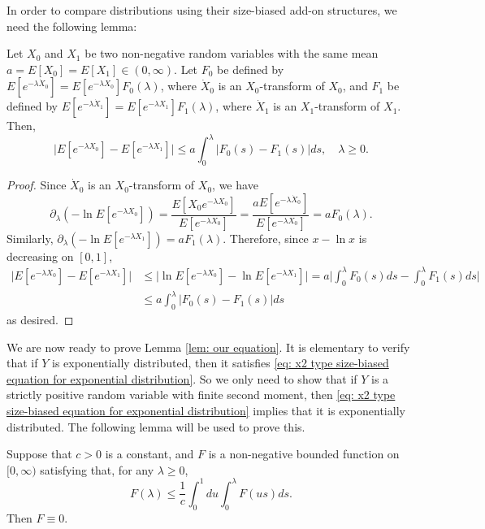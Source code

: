 \documentclass[ECP]{ejpecp} %
\begin{document}
In order to compare distributions using their size-biased add-on structures, we need the following lemma:
\begin{lemma}\label{lem: compare}
	Let $X_0$ and $X_1$ be two non-negative random variables with the same mean $a = E[X_0] = E[X_1] \in (0,\infty)$.
	Let $F_0$ be defined by $E[e^{-\lambda \dot X_0}] = E[e^{-\lambda X_0}] F_0(\lambda)$,
	where $\dot X_0$ is an $X_0$-transform of $X_0$,
	and $F_1$ be defined by $E[e^{-\lambda \dot X_1}] = E[e^{-\lambda X_1}] F_1(\lambda)$,
	where $\dot X_1$ is an $X_1$-transform of $X_1$.
	Then,
	\[
	\big| E[e^{-\lambda X_0}] - E[e^{-\lambda X_1}] \big|
	\leq a \int_0^\lambda| F_0(s) - F_1(s) |ds, \quad \lambda \geq 0.
	\]
\end{lemma}
\begin{proof}
	Since $\dot X_0$ is an $X_0$-transform of $X_0$,
	we have
	\[
	\partial_\lambda ( -\ln E[e^{-\lambda X_0}]) = \frac { E[X_0 e^{-\lambda X_0}]}{ E[e^{-\lambda X_0}] }
	= \frac{a E[e^{-\lambda \dot X_0}]}{E[e^{-\lambda X_0}]}
	= a F_0(\lambda).
	\]
	Similarly, $\partial_\lambda ( -\ln E[e^{-\lambda X_1}]) = a F_1(\lambda)$.
	Therefore,
	since $x - \ln x$ is decreasing on $[0,1]$,
	\[\begin{split}
	\big| E[e^{-\lambda X_0}] - E[e^{-\lambda X_1}] \big|
	&\leq \big| \ln E[e^{-\lambda X_0}] - \ln E[e^{-\lambda X_1}] \big|
	= a\big| \int_0^\lambda F_0(s)ds - \int_0^\lambda F_1(s)ds \big|
	\\& \leq a \int_0^\lambda| F_0(s) - F_1(s) |ds
	\end{split}\]
	as desired.
\end{proof}

We are now ready to prove Lemma \ref{lem: our equation}.
It is elementary to verify that if $Y$ is exponentially distributed, then it satisfies \eqref{eq: x2 type size-biased equation for exponential distribution}.
So we
only need to show
that if $Y$ is a strictly positive random variable with finite second moment, then \eqref{eq: x2 type size-biased equation for exponential distribution} implies that it is exponentially distributed.
The following lemma will be used to prove this.

\begin{lemma}\label{lem: zero inequality}
	Suppose that $c>0$ is a constant, and $F$  is a non-negative bounded function on $[0,\infty)$ satisfying that, for any $\lambda\geq 0$,
	\begin{equation}\label{eq: zero inequality}
	F(\lambda)
	\leq
	\frac{1}{c}\int_0^1du
	\int_0^\lambda F(us)ds.
	\end{equation}
	Then $F\equiv 0$.
\end{lemma}
\end{document}
